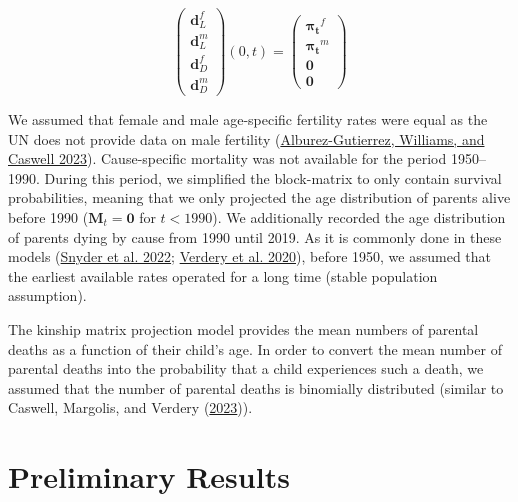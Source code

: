 \documentclass[
  11pt,
  letterpaper,
]{article}
\begin{document}
\[\begin{pmatrix} \boldsymbol{d}^f_L \\ 
\boldsymbol{d}^m_L \\ 
\hline \boldsymbol{d}^f_D \\ 
\boldsymbol{d}^m_D 
\end{pmatrix}(0, t)
=
\begin{pmatrix} \boldsymbol{\pi_t}^f \\ 
\boldsymbol{\pi_t}^m \\ 
\hline \boldsymbol{0} \\ 
\boldsymbol{0} 
\end{pmatrix}
\]

We assumed that female and male age-specific fertility rates were equal as the UN does not provide data on male fertility (\protect\hyperlink{ref-alburez2023projections}{Alburez-Gutierrez, Williams, and Caswell 2023}).
Cause-specific mortality was not available for the period 1950--1990. During this period, we simplified the block-matrix to only contain survival probabilities, meaning that we only projected the age distribution of parents alive before 1990 (\(\boldsymbol{M}_t = \boldsymbol{0}\) for \(t < 1990\)). We additionally recorded the age distribution of parents dying by cause from 1990 until 2019. As it is commonly done in these models (\protect\hyperlink{ref-snyder2022covid}{Snyder et al. 2022}; \protect\hyperlink{ref-verdery2020covid}{Verdery et al. 2020}), before 1950, we assumed that the earliest available rates operated for a long time (stable population assumption).

The kinship matrix projection model provides the mean numbers of parental deaths as a function of their child's age. In order to convert the mean number of parental deaths into the probability that a child experiences such a death, we assumed that the number of parental deaths is binomially distributed (similar to Caswell, Margolis, and Verdery (\protect\hyperlink{ref-caswell2023formal}{2023})).

\hypertarget{preliminary-results}{%
\section{Preliminary Results}\label{preliminary-results}}
\end{document}
